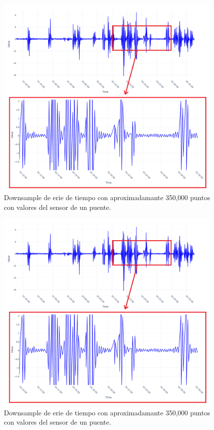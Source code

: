 \begin{figure}
    \centering
    \includegraphics[width=0.9\linewidth]{introduction/images/downsample.png}
    \caption{Downsample de erie de tiempo con aproximadamante 350,000 puntos con valores del sensor de un puente.}
    \label{downsample}
\end{figure}

\begin{figure}
    \centering
    \includegraphics[width=0.9\linewidth]{introduction/images/downsample.png}
    \caption{Downsample de erie de tiempo con aproximadamante 350,000 puntos con valores del sensor de un puente.}
    \label{plotly_vs_resampler}
\end{figure}